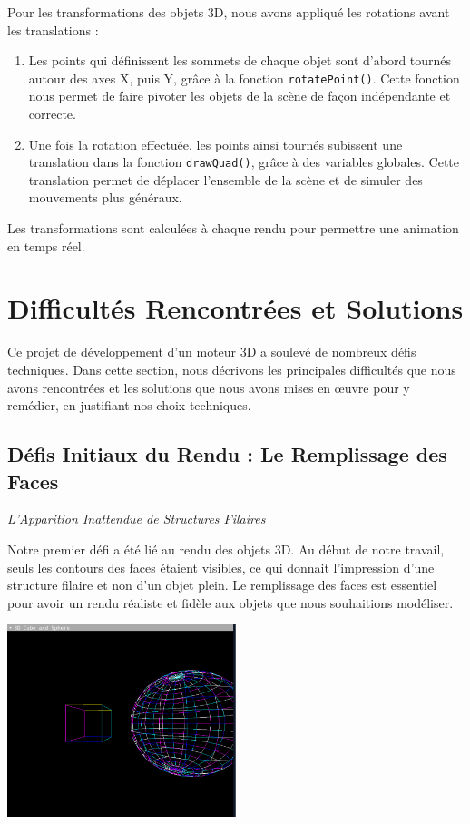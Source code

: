 \documentclass[12pt]{article}
\begin{document}
\noindent Pour les transformations des objets 3D, nous avons appliqué les rotations avant les translations :
\begin{enumerate}
    \item Les points qui définissent les sommets de chaque objet sont d'abord tournés autour des axes X, puis Y, grâce à la fonction \texttt{rotatePoint()}. Cette fonction nous permet de faire pivoter les objets de la scène de façon indépendante et correcte.
    \item Une fois la rotation effectuée, les points ainsi tournés subissent une translation dans la fonction \texttt{drawQuad()}, grâce à des variables globales. Cette translation permet de déplacer l'ensemble de la scène et de simuler des mouvements plus généraux.
\end{enumerate}
Les transformations sont calculées à chaque rendu pour permettre une animation en temps réel.

\section{Difficultés Rencontrées et Solutions}
\label{sec:difficultes}

\noindent Ce projet de développement d'un moteur 3D a soulevé de nombreux défis techniques. Dans cette section, nous décrivons les principales difficultés que nous avons rencontrées et les solutions que nous avons mises en œuvre pour y remédier, en justifiant nos choix techniques.

\subsection{Défis Initiaux du Rendu : Le Remplissage des Faces}
\label{subsec:remplissage_faces}

\textit{L'Apparition Inattendue de Structures Filaires}

\noindent Notre premier défi a été lié au rendu des objets 3D. Au début de notre travail, seuls les contours des faces étaient visibles, ce qui donnait l'impression d'une structure filaire et non d'un objet plein. Le remplissage des faces est essentiel pour avoir un rendu réaliste et fidèle aux objets que nous souhaitions modéliser.

\begin{center}
\includegraphics[width=0.5\textwidth]{1.png}
\end{center}
\end{document}
